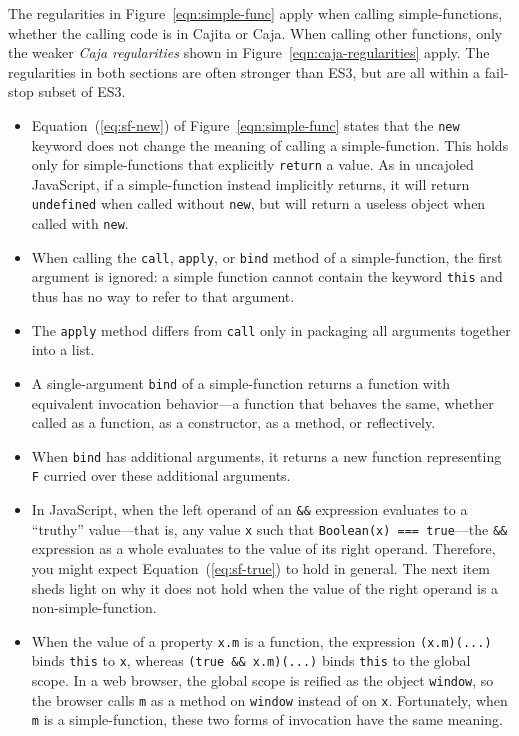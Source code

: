 \documentclass[letterpaper,twocolumn,10pt]{article}
\newcommand{\code}[1]{{\tt {#1}}}              %
\begin{document}
The regularities in Figure~\ref{eqn:simple-func} apply when calling simple-functions, whether the 
calling code is in Cajita or Caja. When calling other functions, only the 
weaker \emph{Caja regularities} shown in Figure~\ref{eqn:caja-regularities} apply. The 
regularities in both sections are often stronger than ES3, but are all within 
a fail-stop subset of ES3.

\begin{itemize}
  \item Equation~(\ref{eq:sf-new}) of Figure~\ref{eqn:simple-func} states that the \code{new} keyword does not change 
  the meaning of calling a simple-function. This holds only for simple-functions that explicitly \code{return} a 
  value. As in uncajoled JavaScript, if a simple-function instead implicitly returns, it will return \code{undefined}
  when called without \code{new}, but will return a useless object when called with \code{new}.
  
  \item When calling the \code{call}, \code{apply}, or \code{bind} method of a simple-function, the first argument is 
  ignored: a simple function cannot contain the keyword \code{this} and thus has no way to refer to that argument.
  
  \item The \code{apply} method differs from \code{call} only in packaging all arguments together into a list.
  
  \item A single-argument \code{bind} of a simple-function returns a function with equivalent invocation behavior---a 
  function that behaves the same, whether called as a function, as a constructor, as a method, or reflectively.
  
  \item When \code{bind} has additional arguments, it returns a new function representing \code{F} curried over these 
  additional arguments.
  
  \item In JavaScript, when the left operand of an \code{\&\&} expression evaluates to a ``truthy'' value---that is,
  any value \code{x} such that \code{Boolean(x) === true}---the \code{\&\&} 
  expression as a whole evaluates to the value of its right operand. Therefore, you might expect 
  Equation~(\ref{eq:sf-true}) to hold in general. The next item sheds light on why it does not hold when the value of 
  the right operand is a non-simple-function.

  \item When the value of a property \code{x.m} is a function, the expression \code{(x.m)(...)} binds \code{this} to \code{x}, 
  whereas \code{(true && x.m)(...)} binds \code{this} to the global scope. In a web browser, the global scope is reified as
  the object \code{window}, so the browser calls \code{m} as a method on \code{window} instead of on \code{x}.  
  Fortunately, when \code{m} is a simple-function, these two forms of invocation have the same meaning.


\end{itemize}
\end{document}

